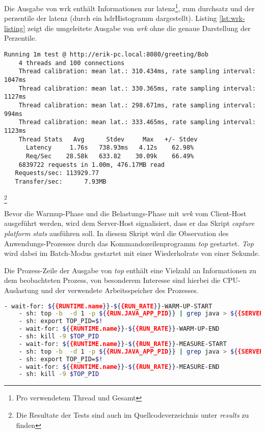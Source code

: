 Die Ausgabe von wrk enthält Informationen zur \Gls{latenz}\footnote{Pro verwendetem Thread und Gesamt},
zum \Gls{durchsatz} und der \Gls{perzentile} der \Gls{latenz} (durch ein \Gls{hdrHistogramm} dargestellt).
Listing \ref*{lst:wrk-listing} zeigt die umgeleitete Ausgabe von \textit{wrk} ohne die genaue Darstellung der Perzentile.

\begin{lstlisting}[caption=Beispiel für Ausgabe von wrk,captionpos=b, label=lst:wrk-listing]
    Running 1m test @ http://erik-pc.local:8080/greeting/Bob
    4 threads and 100 connections
    Thread calibration: mean lat.: 310.434ms, rate sampling interval: 1047ms
    Thread calibration: mean lat.: 330.365ms, rate sampling interval: 1127ms
    Thread calibration: mean lat.: 298.671ms, rate sampling interval: 994ms
    Thread calibration: mean lat.: 333.465ms, rate sampling interval: 1123ms
    Thread Stats   Avg      Stdev     Max   +/- Stdev
      Latency     1.76s   738.93ms   4.12s    62.98%
      Req/Sec    28.58k   633.82    30.09k    66.49%
    6839722 requests in 1.00m, 476.17MB read
   Requests/sec: 113929.77
   Transfer/sec:      7.93MB
   \end{lstlisting}\footnote{Die Resultate der Tests sind auch im Quellcodeverzeichnis unter \textit{\/results} zu finden}

Bevor die Warmup-Phase und die Belastungs-Phase mit \textit{wrk} vom Client-Host ausgeführt werden, wird dem Server-Host signalisiert, dass
er das Skript \textit{capture platform stats} ausführen soll.
In diesem Skript wird die Observation des Anwendungs-Prozesses durch das Kommandozeilenprogramm \textit{top} gestartet.
\textit{Top} wird dabei im Batch-Modus gestartet mit einer Wiederholrate von einer Sekunde.

Die Prozess-Zeile der Ausgabe von \textit{top} enthält eine Vielzahl an Informationen zu dem beobachteten Prozess, von besonderem
Interesse sind hierbei die CPU-Auslastung und der verwendete Arbeitsspeicher des Prozesses.

\begin{lstlisting}[language=sh, caption=Auszug des qDup Skripts capture-platform-stats, captionpos=b]
    - wait-for: ${{RUNTIME.name}}-${{RUN_RATE}}-WARM-UP-START
    - sh: top -b  -d 1 -p ${{RUN.JAVA_APP_PID}} | grep java > ${{SERVER_FILE_PATH}}/output/${{RUNTIME.name}}-${{RUN_RATE}}-WARM-UP-top.out &
    - sh: export TOP_PID=$!
    - wait-for: ${{RUNTIME.name}}-${{RUN_RATE}}-WARM-UP-END
    - sh: kill -9 $TOP_PID
    - wait-for: ${{RUNTIME.name}}-${{RUN_RATE}}-MEASURE-START
    - sh: top -b  -d 1 -p ${{RUN.JAVA_APP_PID}} | grep java > ${{SERVER_FILE_PATH}}/output/${{RUNTIME.name}}-${{RUN_RATE}}-MEASURE-top.out &
    - sh: export TOP_PID=$!
    - wait-for: ${{RUNTIME.name}}-${{RUN_RATE}}-MEASURE-END
    - sh: kill -9 $TOP_PID
  \end{lstlisting}

